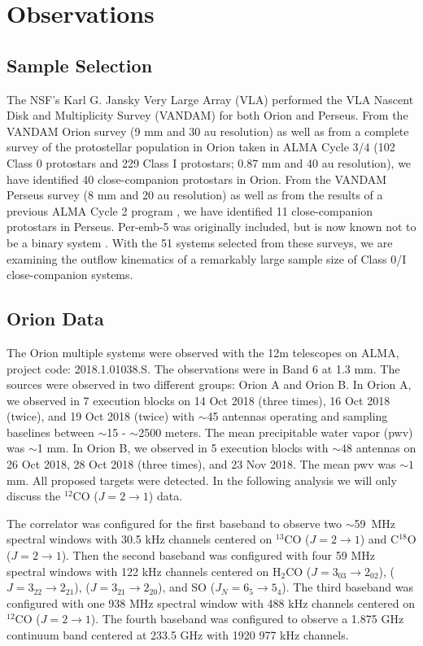 \documentclass[linenumbers,twocolumn, twocolappendix]{aastex631}
\begin{document}
\section{Observations} \label{sec:obs}

\subsection{Sample Selection} \label{sec:obs:sample-selection}
The NSF's Karl G. Jansky Very Large Array (VLA) performed the VLA Nascent Disk and Multiplicity Survey (VANDAM) for both Orion and Perseus. From the VANDAM Orion survey (9 mm and 30 au resolution) as well as from a complete survey of the protostellar population in Orion taken in ALMA Cycle 3/4 (102 Class 0 protostars and 229 Class I protostars; 0.87 mm and 40 au resolution), we have identified 40 close-companion protostars in Orion. From the VANDAM Perseus survey (8 mm and 20 au resolution) as well as from the results of a previous ALMA Cycle 2 program \citep{Tobin_et_al_2018}, we have identified 11 close-companion protostars in Perseus. Per-emb-5 was originally included, but is now known not to be a binary system \citep{Reynolds_et_al_2024}. With the 51 systems selected from these surveys, we are examining the outflow kinematics of a remarkably large sample size of Class 0/I close-companion systems. 

\subsection{Orion Data} \label{sec:obs:orion}
The Orion multiple systems were observed with the 12m telescopes on ALMA, project code: 2018.1.01038.S. The observations were in Band 6 at 1.3 mm. The sources were observed in two different groups: Orion A and Orion B. In Orion A, we observed in 7 execution blocks on 14 Oct 2018 (three times), 16 Oct 2018 (twice), and 19 Oct 2018 (twice) with $\sim$45 antennas operating and sampling baselines between $\sim$15 - $\sim$2500 meters. The mean precipitable water vapor (pwv) was $\sim$1 mm. In Orion B, we observed in 5 execution blocks with $\sim48$ antennas on 26 Oct 2018, 28 Oct 2018 (three times), and 23 Nov 2018. The mean pwv was $\sim1$ mm. All proposed targets were detected. In the following analysis we will only discuss the $^{12}$CO ($J=2\rightarrow1$) data.

The correlator was configured for the first baseband to observe two $\sim$59~MHz spectral windows with 30.5 kHz channels centered on $^{13}$CO ($J=2\rightarrow1$) and C$^{18}$O ($J=2\rightarrow1$). Then the second baseband was configured with four 59 MHz spectral windows with 122 kHz channels centered on H$_2$CO ($J=3_{03}\rightarrow2_{02}$), ($J=3_{22}\rightarrow2_{21}$),  ($J=3_{21}\rightarrow2_{20}$), and SO ($J_N = 6_5\rightarrow5_4$). The third baseband was configured with one 938 MHz spectral window with 488 kHz channels centered on $^{12}$CO ($J=2\rightarrow1$). The fourth baseband was configured to observe a 1.875 GHz continuum band centered at 233.5 GHz with 1920 977 kHz channels.
\end{document}
